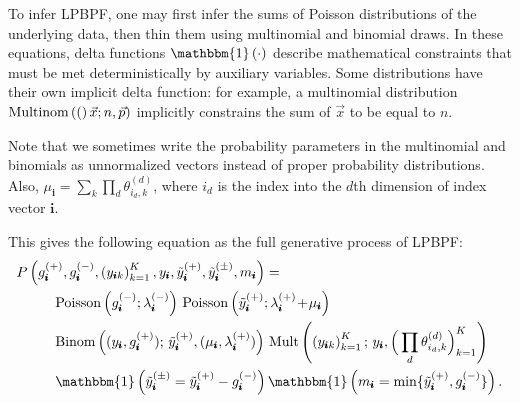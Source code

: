 \documentclass{article}
\newcommand{\subs}{\pmb{i}}
\newcommand{\wsup}[2]{#1_{\subs}^{(#2)}}
\newcommand{\ytP}{\wsup{\tilde{y}}{+}}
\newcommand{\ytPM}{\wsup{\tilde{y}}{\pm}}
\newcommand{\ysk}{y_{\subs k}}
\newcommand{\ys}{y_{\subs}}
\newcommand{\lamP}{\wsup{\lambda}{+}}
\newcommand{\lamM}{\wsup{\lambda}{-}}
\newcommand{\gP}{\wsup{g}{+}}
\newcommand{\gM}{\wsup{g}{-}}
\newcommand{\ms}{m_{\subs}}
\newcommand{\Multi}[1]{\textup{Multinom}\left( #1 \right)}
\newcommand{\Pois}[1]{\textup{Poisson}\left( #1 \right)}
\newcommand{\tp}{\!+\!}
\begin{document}
To infer LPBPF, one may first infer the sums of Poisson distributions of the
underlying data, then thin them using multinomial and binomial draws. In these
equations, delta functions $\mathbbm{1}\left( \cdot \right)$ describe
mathematical constraints that must be met deterministically by auxiliary variables. Some distributions have their own implicit
delta function: for example, a multinomial distribution $\Multi(\vec{x}; n,
\vec{p})$ implicitly constrains the sum of $\vec{x}$ to be
equal to $n$.

Note that we sometimes write the probability parameters in the multinomial and
binomials as unnormalized vectors instead of proper probability distributions.
Also, $\mu_{\subs} = \sum_k \prod_d
\theta_{i_d,k}^{(d)}$, where $i_d$ is the index into the $d$th dimension of
index vector $\subs$.

This gives the following equation as the full generative process of LPBPF:
\begin{align} 
  P &\left(\gP, \gM, \left(\ysk\right)_{k=1}^K, \ys,
    \ytP, \ytPM, \ms\right) = \notag \\
  &\quad\quad \Pois{\gM; \lamM} \,
    \Pois { \ytP; \lamP \tp \mu_{\subs} }
    \notag \\
  &\quad\quad \text{Binom}\left((\ys, \gP);\, \ytP,(\mu_{\subs}, \lamP)\right) \, \text{Mult}\left(\left(\ysk\right)_{k=1}^K;\, \ys, \Big( \prod_d \theta_{i_d,k}^{(d)} \Big)_{k=1}^K\right) \notag \\
  &\quad\quad \mathbbm{1}\left(\ytPM =
    \ytP - \gM\right) \mathbbm{1} \left( \ms =
    \min\{\ytP, \gM\} \right) .
\label{eq:lpbpfpois}
\end{align}
\end{document}
